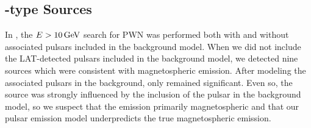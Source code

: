 \subsection{\PSRClass-type Sources}

In \citep{acero_2013a_constraints-galactic}, the
$E>10\,\text{GeV}$ search for \ac{PWN} was performed both
with and without associated pulsars included in the background model.
When we did not include the \ac{LAT}-detected pulsars included in the
background model, we detected nine sources which were consistent with
magnetospheric emission.  After modeling the associated pulsars in the
background, only  remained significant.  Even so, the source
was strongly influenced by the inclusion of the pulsar in the background
model, so we suspect that the emission primarily magnetospheric and that
our pulsar emission model underpredicts the true magnetospheric emission.

